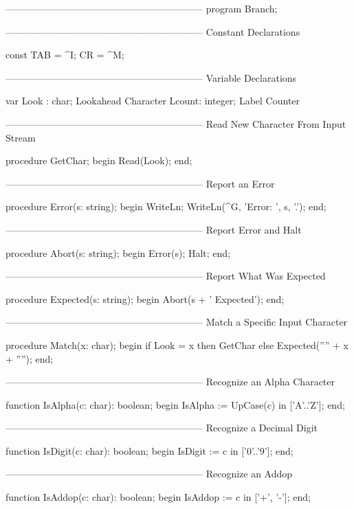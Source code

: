 \documentclass[float=false, crop=false]{standalone}
\begin{document}
\begin{code}
{--------------------------------------------------------------}
program Branch;

{--------------------------------------------------------------}
{ Constant Declarations }

const TAB = ^I;
      CR  = ^M;


{--------------------------------------------------------------}
{ Variable Declarations }

var Look  : char;              { Lookahead Character }
    Lcount: integer;           { Label Counter }


{--------------------------------------------------------------}
{ Read New Character From Input Stream }

procedure GetChar;
begin
   Read(Look);
end;


{--------------------------------------------------------------}
{ Report an Error }

procedure Error(s: string);
begin
   WriteLn;
   WriteLn(^G, 'Error: ', s, '.');
end;


{--------------------------------------------------------------}
{ Report Error and Halt }

procedure Abort(s: string);
begin
   Error(s);
   Halt;
end;


{--------------------------------------------------------------}
{ Report What Was Expected }

procedure Expected(s: string);
begin
   Abort(s + ' Expected');
end;

{--------------------------------------------------------------}
{ Match a Specific Input Character }

procedure Match(x: char);
begin
   if Look = x then GetChar
   else Expected('''' + x + '''');
end;


{--------------------------------------------------------------}
{ Recognize an Alpha Character }

function IsAlpha(c: char): boolean;
begin
   IsAlpha := UpCase(c) in ['A'..'Z'];
end;


{--------------------------------------------------------------}
{ Recognize a Decimal Digit }

function IsDigit(c: char): boolean;
begin
   IsDigit := c in ['0'..'9'];
end;


{--------------------------------------------------------------}
{ Recognize an Addop }

function IsAddop(c: char): boolean;
begin
   IsAddop := c in ['+', '-'];
end;



\end{code}
\end{document}

